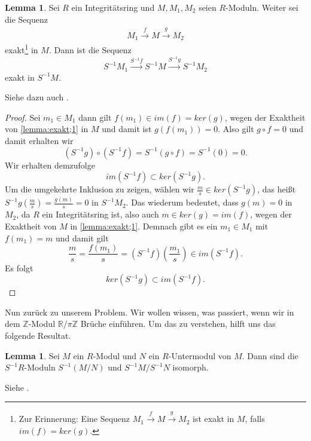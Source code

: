 \documentclass[11pt,titlepage]{article}
\newcommand{\setZ}{\mathbb{Z}}
\newcommand{\setR}{\mathbb{R}}
\theoremstyle{definition}
\newtheorem{lemma}[theorem]{Lemma}
\theoremstyle{remark}
\begin{document}
	\begin{lemma} \label{lemma:Buch;exakt}
		Sei $R$ ein Integritätsring und $M,M_1,M_2$ seien $R$-Moduln. Weiter 
		sei die Sequenz
		\begin{align}
			M_1\xrightarrow{f}M\xrightarrow{g}M_2 \label{lemma:exakt;1}
		\end{align}
		exakt\footnote{Zur Erinnerung: Eine Sequenz $M_1\xrightarrow{f}M\xrightarrow{g}M_2$ ist exakt in $M$, falls 
			$im(f)=ker(g)$.} in $M$. Dann ist die Sequenz
		\[S^{-1}M_1 \xrightarrow{S^{-1}f}S^{-1}M\xrightarrow{S^{-1}g}S^{-1}M_2\]
		exakt in $S^{-1}M$.
	\end{lemma}
	
	Siehe dazu auch \cite[Proposition 3.3]{introductiontocomalg}.
	
	\begin{proof}
		Sei $m_1\in M_1$ dann gilt $f(m_1)\in im(f)=ker(g)$, wegen der Exaktheit 
		von \ref{lemma:exakt;1} in $M$ und damit ist $g(f(m_1))=0$. Also gilt 
		$g\circ f=0$ und damit erhalten wir
		\[(S^{-1}g) \circ (S^{-1}f) = S^{-1}(g\circ f)=S^{-1}(0)=0.\]
		Wir erhalten demzufolge
		\[im(S^{-1}f)\subset ker(S^{-1}g).\]
		Um die umgekehrte Inklusion zu zeigen, wählen wir 
		$\frac{m}{s}\in ker(S^{-1}g)$, das heißt $S^{-1}g\left(\frac{m}{s}\right)=\frac{g(m)}{s}=0$ in $S^{-1}M_2$. 
		Das wiederum bedeutet, dass $g(m)=0$ in $M_2$, da $R$ ein Integritätsring 
		ist, also auch $m\in ker(g)=im(f)$, wegen der Exaktheit von $M$ in 
		\ref{lemma:exakt;1}. Demnach gibt es ein $m_1\in M_1$ mit $f(m_1)=m$ und damit 
		gilt
		\[\frac{m}{s}=\frac{f(m_1)}{s}=(S^{-1}f)\left(\frac{m_1}{s}\right)\in im(S^{-1}f).\]
		Es folgt 
		\[ker(S^{-1}g)\subset im(S^{-1}f).\]
	\end{proof}

	Nun zurück zu unserem Problem. Wir wollen wissen, was passiert, wenn 
	wir in dem $\setZ$-Modul $\setR /\pi\setZ$ Brüche einführen. Um das 
	zu verstehen, hilft uns das folgende Resultat.
	
	\begin{lemma}
		Sei $M$ ein $R$-Modul und $N$ ein $R$-Untermodul von $M$. Dann sind die $S^{-1}R$-Moduln $S^{-1}(M/N)$ und 
		$S^{-1}M/S^{-1}N$ isomorph.
	\end{lemma}
	
	Siehe \cite[Korollar 3.4 (iii)]{introductiontocomalg}.
	
\end{document}
